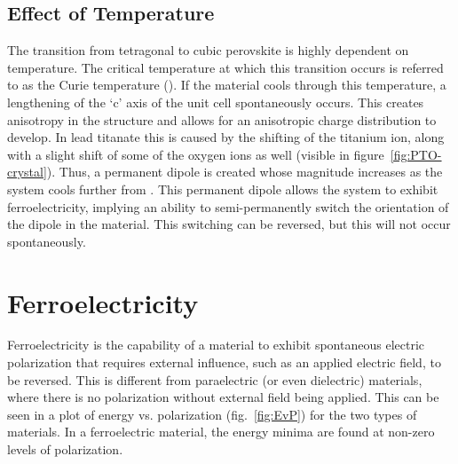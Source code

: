 
\subsection{Effect of Temperature}

The transition from tetragonal to cubic perovskite is highly dependent on temperature. The critical temperature at which this transition occurs is referred to as the Curie temperature (\Tc{}). If the material cools through this temperature, a lengthening of the `c' axis of the unit cell spontaneously occurs. This creates anisotropy in the structure and allows for an anisotropic charge distribution to develop. In lead titanate this is caused by the shifting of the titanium ion, along with a slight shift of some of the oxygen ions as well (visible in figure~\ref{fig:PTO-crystal}). Thus, a permanent dipole is created whose magnitude increases as the system cools further from \Tc{}. This permanent dipole allows the system to exhibit ferroelectricity, implying an ability to semi-permanently switch the orientation of the dipole in the material. This switching can be reversed, but this will not occur spontaneously. 



\section{Ferroelectricity}

Ferroelectricity is the capability of a material to exhibit spontaneous electric polarization that requires external influence, such as an applied electric field, to be reversed. This is different from paraelectric (or even dielectric) materials, where there is no polarization without external field being applied. This can be seen in a plot of energy vs. polarization (fig.~\ref{fig:EvP}) for the two types of materials. In a ferroelectric material, the energy minima are found at non-zero levels of polarization. 

